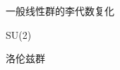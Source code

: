 

\begin{definition}{}

\end{definition}
\begin{example}{一般线性群的李代数复化}

\end{example}
\begin{example}{SU(2)}

\end{example}
\begin{example}{洛伦兹群}

\end{example}
